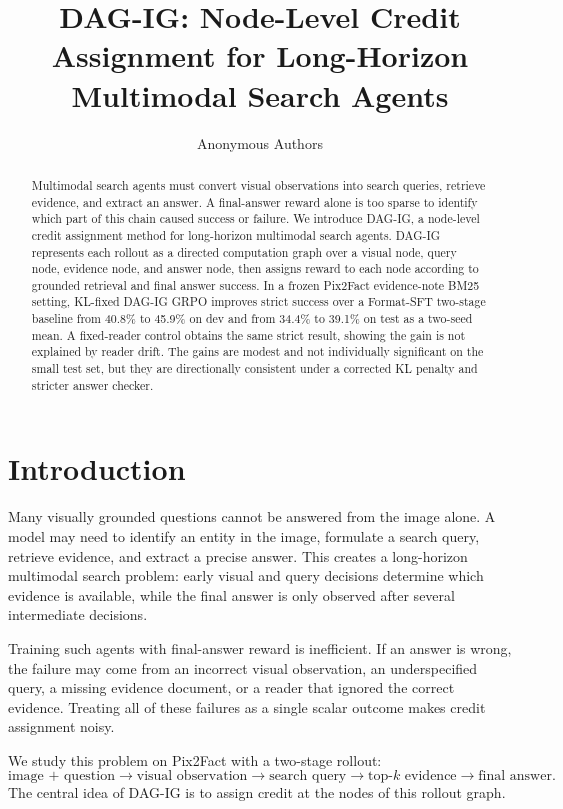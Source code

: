 \documentclass[11pt]{article}
\title{DAG-IG: Node-Level Credit Assignment for Long-Horizon Multimodal Search Agents}
\author{Anonymous Authors}
\date{}
\begin{document}
\maketitle

\begin{abstract}
Multimodal search agents must convert visual observations into search queries, retrieve evidence, and extract an answer. A final-answer reward alone is too sparse to identify which part of this chain caused success or failure. We introduce DAG-IG, a node-level credit assignment method for long-horizon multimodal search agents. DAG-IG represents each rollout as a directed computation graph over a visual node, query node, evidence node, and answer node, then assigns reward to each node according to grounded retrieval and final answer success. In a frozen Pix2Fact evidence-note BM25 setting, KL-fixed DAG-IG GRPO improves strict success over a Format-SFT two-stage baseline from 40.8\% to 45.9\% on dev and from 34.4\% to 39.1\% on test as a two-seed mean. A fixed-reader control obtains the same strict result, showing the gain is not explained by reader drift. The gains are modest and not individually significant on the small test set, but they are directionally consistent under a corrected KL penalty and stricter answer checker.
\end{abstract}

\section{Introduction}

Many visually grounded questions cannot be answered from the image alone. A model may need to identify an entity in the image, formulate a search query, retrieve evidence, and extract a precise answer. This creates a long-horizon multimodal search problem: early visual and query decisions determine which evidence is available, while the final answer is only observed after several intermediate decisions.

Training such agents with final-answer reward is inefficient. If an answer is wrong, the failure may come from an incorrect visual observation, an underspecified query, a missing evidence document, or a reader that ignored the correct evidence. Treating all of these failures as a single scalar outcome makes credit assignment noisy.

We study this problem on Pix2Fact with a two-stage rollout:
\[
\text{image + question} \rightarrow \text{visual observation} \rightarrow \text{search query} \rightarrow \text{top-}k\text{ evidence} \rightarrow \text{final answer}.
\]
The central idea of DAG-IG is to assign credit at the nodes of this rollout graph.
\end{document}
